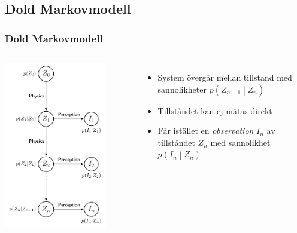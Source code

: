 \documentclass[]{beamer}
\renewcommand{\ae}{\"{a}}
\renewcommand{\oe}{\"{o}}
\newcommand{\prob}[1]{p\left(#1\right)}
\newcommand{\cprob}[2]{\prob{\left. #1 \middle\vert #2 \right.}}
\newcommand{\cprobnext}[1]{\cprob{#1_{n+1}}{#1_n}}
\begin{document}
\subsection{Dold Markovmodell}
\begin{frame}
\frametitle{Dold Markovmodell}
  \begin{columns}[c]
    \column{2in}
    \includegraphics[width=0.8\textwidth]{hmm-graph.pdf}
    
    \column{2in}
    \begin{itemize}
    \item System \oe verg\aa r mellan tillst\aa nd med sannolikheter $\cprobnext{Z}$
    \item Tillst\aa ndet kan ej m\ae tas direkt
    \item F\aa r ist\ae llet en \emph{observation} $I_n$ av tillst\aa ndet $Z_n$ med sannolikhet $\cprob{I_n}{Z_n}$
    \end{itemize}
  \end{columns}
\end{frame}
\end{document}
